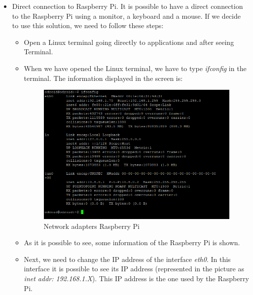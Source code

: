\begin{itemize}

\item Direct connection to Raspberry Pi. It is possible to have a direct connection to the Raspberry Pi using a monitor, a keyboard and a mouse. If we decide to use this solution, we need to follow these steps:

\begin{itemize}

\item Open a Linux terminal going directly to applications and after seeing Terminal.

\item When we have opened the Linux terminal, we have to type \textit{ifconfig} in the terminal. The information displayed in the screen is:

\begin{figure}[H]
\begin{centering}
\includegraphics[scale=0.8]{IMGS/ifconfig_raspberry_pi.PNG}
\caption{Network adapters Raspberry Pi \label{Network adapters Raspberry Pi}}
\end{centering}
\end{figure} 

\item As it is possible to see, some information of the Raspberry Pi is shown.

\item Next, we need to change the IP address of the interface \textit{eth0}. In this interface it is possible to see its IP address (represented in the picture as \textit{inet addr: 192.168.1.X}). This IP address is the one used by the Raspberry Pi.


\end{itemize}
\end{itemize}
